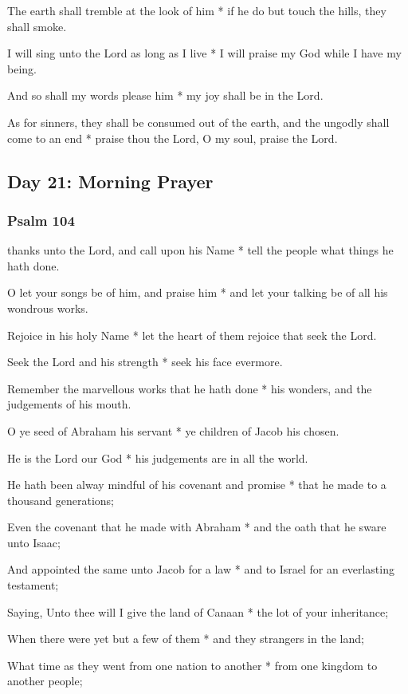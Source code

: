 The earth shall tremble at the look of him * if he do but touch the hills, they shall smoke.

I will sing unto the Lord as long as I live * I will praise my God while I have my being.

And so shall my words please him * my joy shall be in the Lord.

As for sinners, they shall be consumed out of the earth, and the ungodly shall come to an end * praise thou the Lord, O my soul, praise the Lord.

\subsection{Day 21: Morning Prayer}

\subsubsection{Psalm 104}


 thanks unto the Lord, and call upon his Name * tell the people what things he hath done.

O let your songs be of him, and praise him * and let your talking be of all his wondrous works.

Rejoice in his holy Name * let the heart of them rejoice that seek the Lord.

Seek the Lord and his strength * seek his face evermore.

Remember the marvellous works that he hath done * his wonders, and the judgements of his mouth.

O ye seed of Abraham his servant * ye children of Jacob his chosen.

He is the Lord our God * his judgements are in all the world.

He hath been alway mindful of his covenant and promise * that he made to a thousand generations;

Even the covenant that he made with Abraham * and the oath that he sware unto Isaac;

And appointed the same unto Jacob for a law * and to Israel for an everlasting testament;

Saying, Unto thee will I give the land of Canaan * the lot of your inheritance;

When there were yet but a few of them * and they strangers in the land;

What time as they went from one nation to another * from one kingdom to another people;

